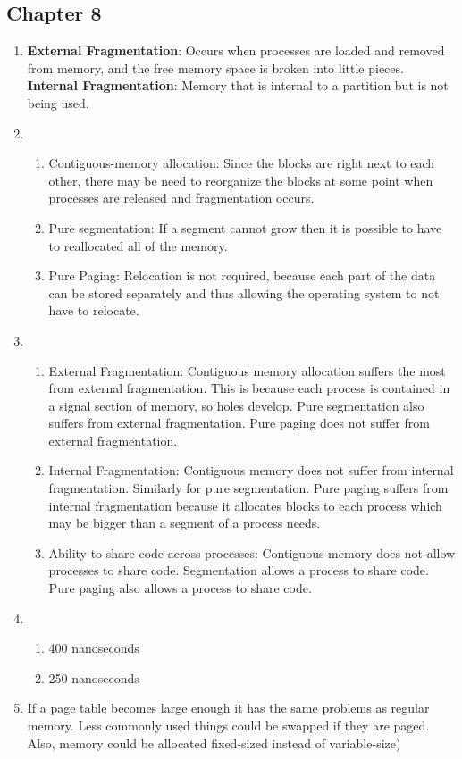 \documentclass{article}
\begin{document}
\subsection*{Chapter 8}
\begin{enumerate}
\setcounter{enumi}{0}
\item \textbf{External Fragmentation}: Occurs when processes are loaded and removed from memory, and the free memory space is broken into little pieces. \textbf{Internal Fragmentation}: Memory that is internal to a partition but is not being used.
\setcounter{enumi}{3}
\item
  \begin{enumerate}
    \item Contiguous-memory allocation: Since the blocks are right next to each other, there may be need to reorganize the blocks at some point when processes are released and fragmentation occurs.
    \item Pure segmentation: If a segment cannot grow then it is possible to have to reallocated all of the memory.
    \item Pure Paging: Relocation is not required, because each part of the data can be stored separately and thus allowing the operating system to not have to relocate.
  \end{enumerate}
\setcounter{enumi}{4}
\item \begin{enumerate}
    \item External Fragmentation: Contiguous memory allocation suffers the most from external fragmentation. This is because each process is contained in a signal section of memory, so holes develop. Pure segmentation also suffers from external fragmentation. Pure paging does not suffer from external fragmentation.
    \item Internal Fragmentation: Contiguous memory does not suffer from internal fragmentation. Similarly for pure segmentation. Pure paging suffers from internal fragmentation because it allocates blocks to each process which may be bigger than a segment of a process needs.
    \item Ability to share code across processes: Contiguous memory does not allow processes to share code. Segmentation allows a process to share code. Pure paging also allows a process to share code.
  \end{enumerate}
\setcounter{enumi}{8}
\item 
  \begin{enumerate}
  \item 400 nanoseconds
  \item 250 nanoseconds
  \end{enumerate}
\setcounter{enumi}{12}
\item If a page table becomes large enough it has the same problems as regular memory. Less commonly used things could be swapped if they are paged. Also, memory could be allocated fixed-sized instead of variable-size)
\end{enumerate}
\end{document}
